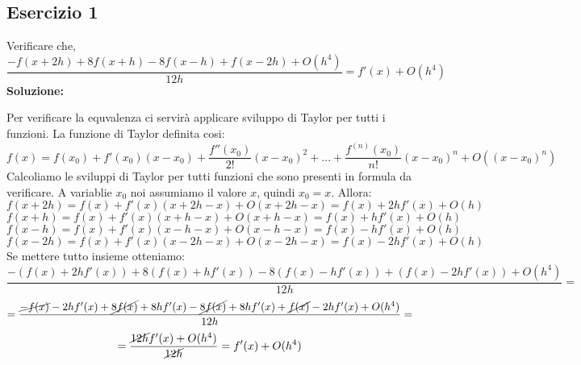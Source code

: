 \subsection{Esercizio 1}
\newcommand\esOneFormula[4]
{\frac{-#1 + 8#2 - 8#3 + #4 + O(h^4)}{12h}}
Verificare che,
\[
    \esOneFormula{f(x+2h)}{f(x+h)}{f(x-h)}{f(x-2h)} = f'(x)+ O(h^4)
\]
\newline \textbf{Soluzione:} \newline

Per verificare la equvalenza ci servirà applicare sviluppo di Taylor per tutti i funzioni.
La funzione di Taylor definita cosi:
\[
    f(x) = f(x_0) + f'(x_0)(x-x_0) + \frac{f''(x_0)}{2!}(x-x_0)^2 + ... + \frac{f^{(n)}(x_0)}{n!}(x-x_0)^n + O((x-x_0)^n)
\]
\newcommand\esOneTaylorTwoSteps[2]
{f(#2) + f'(#2)(#1-#2) + O(#1-#2)}
Calcoliamo le sviluppi di Taylor per tutti funzioni che sono presenti in formula da verificare.
A variablie $x_0$ noi assumiamo il valore $x$, quindi $x_0=x$. Allora:
\[
    f(x+2h) = \esOneTaylorTwoSteps{x+2h}{x} = f(x) + 2hf'(x) + O(h)
\]
\[
    f(x+h) = \esOneTaylorTwoSteps{x+h}{x} = f(x) + hf'(x) + O(h)
\]
\[
    f(x-h) = \esOneTaylorTwoSteps{x-h}{x} = f(x) - hf'(x) + O(h)
\]
\[
    f(x-2h) = \esOneTaylorTwoSteps{x-2h}{x} = f(x) - 2hf'(x) + O(h)
\]
Se mettere tutto insieme otteniamo:
\[
    \esOneFormula{(f(x) + 2hf'(x))}{(f(x) + hf'(x))}{(f(x) - hf'(x))}{(f(x) - 2hf'(x))} =
\]
\[
    = \frac{
        \cancel{-f(x)} - 2hf'(x) 
        + \cancel{8f(x)} + 8hf'(x) 
        - \cancel{8f(x)} + 8hf'(x) 
        + \cancel{f(x)} - 2hf'(x) 
        + O(h^4)}
    {12h} =
\]
\[
    = \frac{\cancel{12h}f'(x) + O(h^4)}{\cancel{12h}} = f'(x) + O(h^4)
\]
